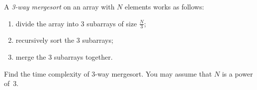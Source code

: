 A {\em 3-way mergesort} on an array with $N$ elements works as follows:

\begin{enumerate}

\item  divide the array into 3 subarrays of size $\frac{N}{3}$;

\item  recursively sort the 3 subarrays;

\item  merge the 3 subarrays together.

\end{enumerate}

Find the time complexity of 3-way mergesort.  You may assume that $N$
is a power of~3.
